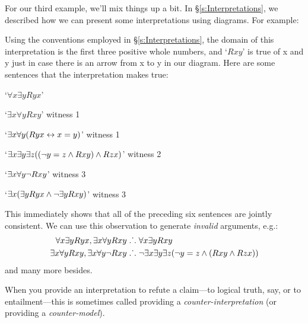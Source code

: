 For our third example, we'll mix things up a bit. In \S\ref{s:Interpretations}, we described how we can present some interpretations using diagrams. For example:
\begin{center}
\end{center}
Using the conventions employed in \S\ref{s:Interpretations}, the domain of this interpretation is the first three positive whole numbers, and `$Rxy$' is true of x and y just in case there is an arrow from x to y in our diagram. Here are some sentences that the interpretation makes true:
	\begin{ebullet}
		\item `$\forall x \exists y Ryx$' 
		\item `$\exists x \forall y Rxy$' \hfill witness 1
		\item `$\exists x \forall y (Ryx \leftrightarrow x = y)$' \hfill witness 1
		\item `$\exists x \exists y \exists z ((\neg y = z \wedge Rxy) \wedge Rzx)$' \hfill witness 2
		\item `$\exists x \forall y \neg Rxy$' \hfill witness 3
		\item `$\exists x (\exists y Ryx \wedge \neg \exists y Rxy)$' \hfill witness 3
	\end{ebullet}
This immediately shows that all of the preceding six sentences are jointly consistent. We can use this observation to generate \emph{invalid} arguments, e.g.:
	\begin{align*}
		\forall x \exists y Ryx, \exists x \forall y Rxy  &\mathrel{\ldotp\dot{}\,\ldotp}  \forall x \exists y Rxy\\
		\exists x \forall y Rxy, \exists x \forall y \neg Rxy & \mathrel{\ldotp\dot{}\,\ldotp} \neg \exists x \exists y \exists z (\neg y = z \wedge (Rxy \wedge Rzx))
	\end{align*}
and many more besides.

When you provide an interpretation to refute a claim---to logical truth, say, or to entailment---this is sometimes called providing a \emph{counter-interpretation} (or providing a \emph{counter-model}).

